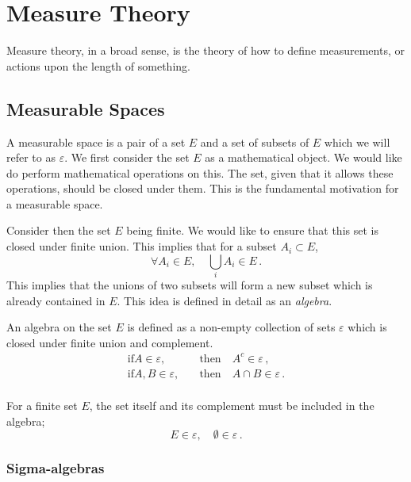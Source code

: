 \chapter{Measure Theory}

Measure theory, in a broad sense, is the theory of how to define measurements, or actions upon the length of something. 

\section{Measurable Spaces}

A measurable space is a pair of a set $E$ and a set of subsets of $E$ which we will refer to as $\varepsilon$. We first consider the set $E$ as a mathematical object. We would like do perform mathematical operations on this. The set, given that it allows these operations, should be closed under them. This is the fundamental motivation for a measurable space.

Consider then the set $E$ being finite. We would like to ensure that this set is closed under finite union. This implies that for a subset $A_i \subset E$,
\begin{equation}
	\forall A_i \in E, \quad \bigcup_i A_i \in E\,.
\end{equation}
This implies that the unions of two subsets will form a new subset which is already contained in $E$. This idea is defined in detail as an \textit{algebra}.

\begin{definition}
	An algebra on the set $E$ is defined as a non-empty collection of sets $\varepsilon$ which is closed under finite union and complement.
	\begin{align*}
		\mathrm{if }A \in \varepsilon, &\quad\mathrm{then} \quad A^c \in \varepsilon\,,\\
		\mathrm{if }A, B \in \varepsilon, &\quad \mathrm{ then}\quad A\cap B \in \varepsilon\,.\\
	\end{align*}
\end{definition}
For a finite set $E$, the set itself and its complement must be included in the algebra;
\begin{equation}
	E\in \varepsilon, \quad \emptyset \in \varepsilon\,.
\end{equation}

\subsection{Sigma-algebras}

